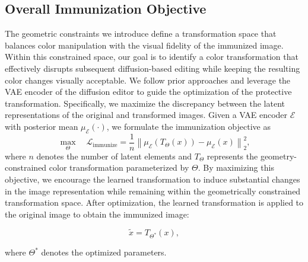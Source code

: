 
\subsection{Overall Immunization Objective}
\label{sec:objective}
The geometric constraints we introduce define a transformation space that balances color manipulation with the visual fidelity of the immunized image. Within this constrained space, our goal is to identify a color transformation that effectively disrupts subsequent diffusion-based editing while keeping the resulting color changes visually acceptable. We follow prior approaches and leverage the VAE encoder of the diffusion editor to guide the optimization of the protective transformation. Specifically, we maximize the discrepancy between the latent representations of the original and transformed images. Given a VAE encoder $\mathcal{E}$ with posterior mean $\mu_{\mathcal{E}}(\cdot)$, we formulate the immunization objective as
\begin{equation}
\max_{\Theta}\quad
\mathcal{L}_{\mathrm{immunize}}
=
\frac{1}{n}
\left\|
\mu_{\mathcal{E}}\left(T_{\Theta}(x)\right)
-
\mu_{\mathcal{E}}(x)
\right\|_2^2,
\label{eq:objective}
\end{equation}
where $n$ denotes the number of latent elements and $T_{\Theta}$ represents the geometry-constrained color transformation parameterized by $\Theta$. By maximizing this objective, we encourage the learned transformation to induce substantial changes in the image representation while remaining within the geometrically constrained transformation space.
After optimization, the learned transformation is applied to the original image to obtain the immunized image:

\begin{equation}
\tilde{x}=T_{\Theta^*}(x),
\label{eq:protected}
\end{equation}

where $\Theta^*$ denotes the optimized parameters.


